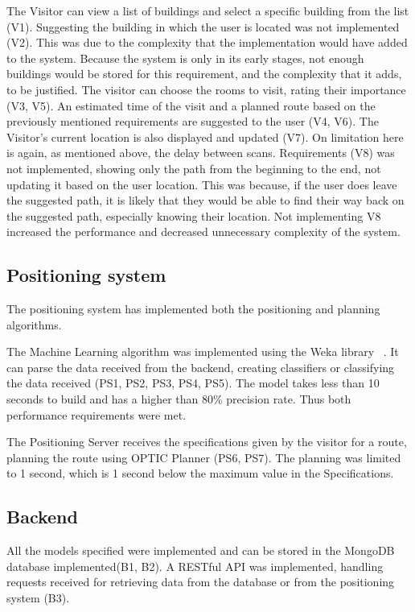 The Visitor can view a list of buildings and select a specific building from the list (V1). Suggesting the building in which the user is located was not implemented (V2). This was due to the complexity that the implementation would have added to the system. Because the system is only in its early stages, not enough buildings would be stored for this requirement, and the complexity that it adds, to be justified. The visitor can choose the rooms to visit, rating their importance (V3, V5). An estimated time of the visit and a planned route based on the previously mentioned requirements are suggested to the user (V4, V6). The Visitor's current location is also displayed and updated (V7). On limitation here is again, as mentioned above, the delay between scans. Requirements (V8) was not implemented, showing only the path from the beginning to the end, not updating it based on the user location. This was because, if the user does leave the suggested path, it is likely that they would be able to find their way back on the suggested path, especially knowing their location. Not implementing V8 increased the performance and decreased unnecessary complexity of the system.

\subsection{Positioning system}
The positioning system has implemented both the positioning and planning algorithms. 

The Machine Learning algorithm was implemented using the Weka library ~\cite{Weka}. It can parse the data received from the backend, creating classifiers or classifying the data received (PS1, PS2, PS3, PS4, PS5). The model takes less than 10 seconds to build and has a higher than 80\% precision rate. Thus both performance requirements were met.

The Positioning Server receives the specifications given by the visitor for a route, planning the route using OPTIC Planner (PS6, PS7). The planning was limited to 1 second, which is 1 second below the maximum value in the Specifications.

\subsection{Backend}
All the models specified were implemented and can be stored in the MongoDB database implemented(B1, B2). A RESTful API was implemented, handling requests received for retrieving data from the database or from the positioning system (B3).     




 
